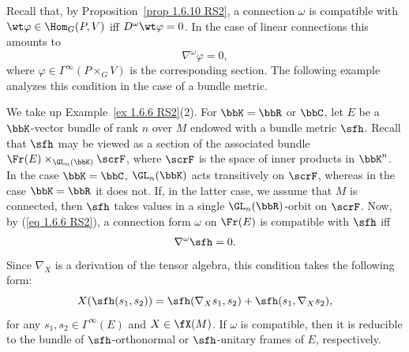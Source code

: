 Recall that, by Proposition~\ref{prop 1.6.10 RS2}, a connection $\omega$ is compatible with $\wt\varphi\in\Hom_G(P,V)$ iff $D^\omega\wt\varphi=0$. In the case of linear connections this amounts to 
\[\nabla^\omega\varphi=0,\label{eq 1.6.6 RS2}\]
where $\varphi\in\Gamma^\infty(P\times_G V)$ is the corresponding section.  The following example analyzes this condition in the case of a bundle metric.

\begin{example}\label{ex 1.6.12 RS2}
    We take up Example~\ref{ex 1.6.6 RS2}(2). For $\bbK=\bbR$ or $\bbC$, let $E$ be a $\bbK$-vector bundle of rank $n$ over $M$ endowed with a bundle metric $\sfh$. Recall that $\sfh$ may be viewed as a section of the associated bundle $\Fr (E)\times_{\GL_n(\bbK)}\scrF$, where $\scrF$ is the space of inner products in $\bbK^n$. In the case $\bbK=\bbC$, $\GL_n(\bbK)$ acts transitively on $\scrF$, whereas in the case $\bbK=\bbR$ it does not. If, in the latter case, we assume that $M$ is connected, then $\sfh$ takes values in a single $\GL_n(\bbR)$-orbit on $\scrF$. Now, by (\ref{eq 1.6.6 RS2}), a connection form $\omega$ on $\Fr(E)$ is compatible with $\sfh$ iff 
    \[\nabla^\omega\sfh=0.\]
    Since $\nabla_X$ is a derivation of the tensor algebra, this condition takes the following form:
    \[X(\sfh(s_1,s_2))=\sfh(\nabla_X s_1,s_2)+\sfh(s_1,\nabla_X s_2),\]
    for any $s_1,s_2\in\Gamma^\infty(E)$ and $X\in\fX(M)$. If $\omega$ is compatible, then it is reducible to the bundle of $\sfh$-orthonormal or $\sfh$-unitary frames of $E$, respectively.
\end{example}



